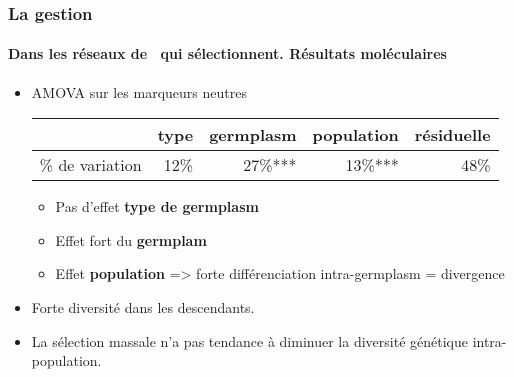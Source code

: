 \begin{frame}
\frametitle{La gestion \insitu}
\framesubtitle{Dans les réseaux de \MSPs~qui sélectionnent. Résultats moléculaires}

\begin{itemize}

\item AMOVA sur les marqueurs neutres

\begin{tabular}{p{}rrrr}
\hline
& type & germplasm & population & résiduelle \\
\hline
\% de variation & 12\% & 27\%*** & 13\%*** & 48\% \\
\hline
\end{tabular}

\begin{itemize}
\item Pas d'effet \textbf{type de germplasm}
\item Effet fort du \textbf{germplam}
\item Effet \textbf{population} => forte différenciation intra-germplasm = divergence
\end{itemize}

\item Forte diversité dans les descendants. %

\item La sélection massale n'a pas tendance à diminuer la diversité génétique intra-population.

\end{itemize}

\end{frame}



